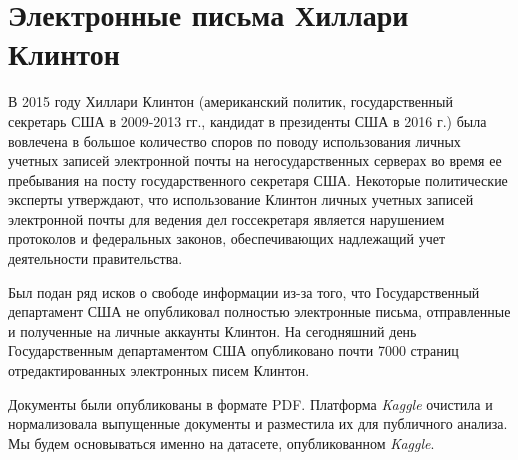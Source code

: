 \section{Электронные письма Хиллари Клинтон}

В 2015 году Хиллари Клинтон (американский политик, государственный секретарь США в 2009-2013 гг., кандидат в президенты США в 2016 г.) была вовлечена в большое количество споров по поводу использования личных учетных записей электронной почты на негосударственных серверах во время ее пребывания на посту государственного секретаря США. Некоторые политические эксперты утверждают, что использование Клинтон личных учетных записей электронной почты для ведения дел госсекретаря является нарушением протоколов и федеральных законов, обеспечивающих надлежащий учет деятельности правительства. 



Был подан ряд исков о свободе информации из-за того, что Государственный департамент США не опубликовал полностью электронные письма, отправленные и полученные на личные аккаунты Клинтон. На сегодняшний день Государственным департаментом США опубликовано почти 7000 страниц отредактированных электронных писем Клинтон. 

Документы были опубликованы в формате PDF. Платформа \textit{Kaggle} очистила и нормализовала выпущенные документы и разместила их для публичного анализа. Мы будем основываться именно на датасете, опубликованном \textit{Kaggle}.